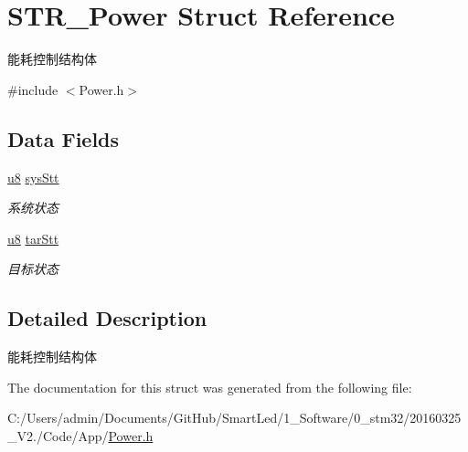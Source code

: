 \hypertarget{struct_s_t_r___power}{\section{\-S\-T\-R\-\_\-\-Power \-Struct \-Reference}
\label{struct_s_t_r___power}
}


能耗控制结构体  




{\ttfamily \#include $<$\-Power.\-h$>$}

\subsection*{\-Data \-Fields}
\begin{DoxyCompactItemize}
\item 
\hypertarget{struct_s_t_r___power_a79e6c32c42d5d84ede43fd91791e82ee}{\hyperlink{group___b_s_p_gaed742c436da53c1080638ce6ef7d13de}{u8} \hyperlink{struct_s_t_r___power_a79e6c32c42d5d84ede43fd91791e82ee}{sys\-Stt}}\label{struct_s_t_r___power_a79e6c32c42d5d84ede43fd91791e82ee}

\begin{DoxyCompactList}\small\item\em 系统状态 \end{DoxyCompactList}\item 
\hypertarget{struct_s_t_r___power_ae975d5225f9438af06f30fa8697f2a64}{\hyperlink{group___b_s_p_gaed742c436da53c1080638ce6ef7d13de}{u8} \hyperlink{struct_s_t_r___power_ae975d5225f9438af06f30fa8697f2a64}{tar\-Stt}}\label{struct_s_t_r___power_ae975d5225f9438af06f30fa8697f2a64}

\begin{DoxyCompactList}\small\item\em 目标状态 \end{DoxyCompactList}\end{DoxyCompactItemize}


\subsection{\-Detailed \-Description}
能耗控制结构体 

\-The documentation for this struct was generated from the following file\-:\begin{DoxyCompactItemize}
\item 
\-C\-:/\-Users/admin/\-Documents/\-Git\-Hub/\-Smart\-Led/1\-\_\-\-Software/0\-\_\-stm32/20160325\-\_\-\-V2./\-Code/\-App/\hyperlink{_power_8h}{\-Power.\-h}\end{DoxyCompactItemize}
